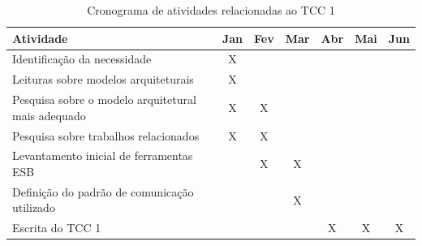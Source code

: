 \begin{table}[!htb]
\centering
\caption{Cronograma de atividades relacionadas ao TCC 1}
\label{cronograma_tcc1}
\begin{tabular}{|p{9cm}|c|c|c|c|c|c|}
\hline
Atividade                                                   & \multicolumn{1}{l|}{Jan} & \multicolumn{1}{l|}{Fev} & \multicolumn{1}{l|}{Mar} & \multicolumn{1}{l|}{Abr} & \multicolumn{1}{l|}{Mai} & \multicolumn{1}{l|}{Jun} \\ \hline
Identificação da necessidade                                & X                           &                             &                              &                            &                             &                              \\ \hline
Leituras sobre modelos arquiteturais                        & X                           &                             &                              &                            &                             &                              \\ \hline
Pesquisa sobre o modelo arquitetural mais adequado          & X                           & X                             &                              &                            &                             &                              \\ \hline
Pesquisa sobre trabalhos relacionados                       & X                           & X                        &                              &                            &                             &                              \\ \hline
Levantamento inicial de ferramentas ESB                    &                             & X                        & X                            &                            &                             &                              \\ \hline
Definição do padrão de comunicação utilizado                &                             &                          & X                            &                            &                             &                              \\ \hline
Escrita do TCC 1                                            &                             &                             &                              & X                           & X                           & X          \\ \hline
\end{tabular}
\end{table}

